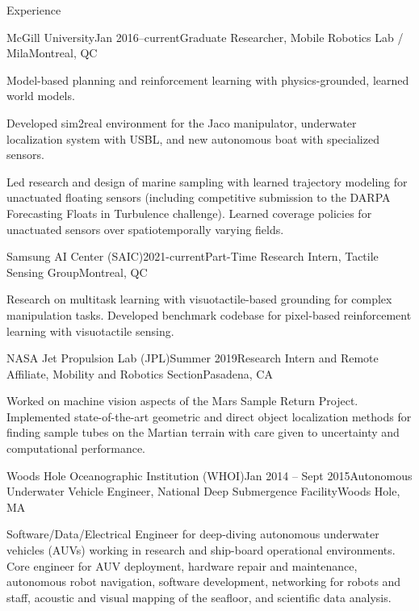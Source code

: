 \documentclass{resume} %
\begin{document}
\begin{rSection}{Experience}
\begin{rSubsection}{McGill University}{Jan 2016--current}{Graduate Researcher, Mobile Robotics Lab / Mila}{Montreal, QC}
\item{Model-based planning and reinforcement learning with physics-grounded, learned world models. }
\item{Developed sim2real environment for the Jaco manipulator, underwater localization system with USBL, and new autonomous boat with specialized sensors.}
\item{Led research and design of marine sampling with learned trajectory modeling for unactuated floating sensors (including competitive submission to the DARPA Forecasting Floats in Turbulence challenge). Learned coverage policies for unactuated sensors over spatiotemporally varying fields. } 
\end{rSubsection}
\vspace{-.2cm}
	\begin{rSubsection}{Samsung AI Center (SAIC)}{2021-current}{Part-Time Research Intern, Tactile Sensing Group}{Montreal, QC}
\item{Research on multitask learning with visuotactile-based grounding for complex manipulation tasks. Developed benchmark codebase for pixel-based reinforcement learning with visuotactile sensing.}
\end{rSubsection}
\vspace{-.2cm}
\begin{rSubsection}{NASA Jet Propulsion Lab (JPL)}{Summer 2019}{Research Intern and Remote Affiliate, Mobility and Robotics Section}{Pasadena, CA}
\item{Worked on machine vision aspects of the Mars Sample Return Project. Implemented state-of-the-art geometric and direct object localization methods for finding sample tubes on the Martian terrain with care given to uncertainty and computational performance. }
\end{rSubsection}
	\vspace{-.2cm}
\begin{rSubsection}{Woods Hole Oceanographic Institution (WHOI)}{Jan 2014 -- Sept 2015}{Autonomous Underwater Vehicle Engineer, National Deep Submergence Facility}{Woods Hole, MA}
\item{Software/Data/Electrical Engineer for deep-diving autonomous underwater vehicles (AUVs) working in research and ship-board operational environments. Core engineer for AUV deployment, hardware repair and maintenance, autonomous robot navigation, software development, networking for robots and staff, acoustic and visual mapping of the seafloor, and scientific data analysis.}

\end{rSubsection}
\end{rSection}
\end{document}
